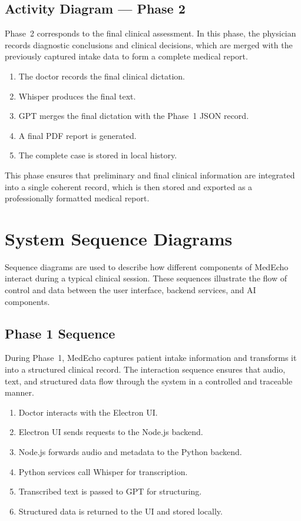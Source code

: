 \subsection{Activity Diagram — Phase 2}\label{sec:analysis:activity2}

Phase~2 corresponds to the final clinical assessment. In this phase, the physician records diagnostic conclusions and clinical decisions, which are merged with the previously captured intake data to form a complete medical report.


\begin{enumerate}
    \item The doctor records the final clinical dictation.
    \item Whisper produces the final text.
    \item GPT merges the final dictation with the Phase~1 JSON record.
    \item A final PDF report is generated.
    \item The complete case is stored in local history.
\end{enumerate}
This phase ensures that preliminary and final clinical information are integrated into a single coherent record, which is then stored and exported as a professionally formatted medical report.




\section{System Sequence Diagrams}\label{sec:analysis:seq}

Sequence diagrams are used to describe how different components of MedEcho interact during a typical clinical session. These sequences illustrate the flow of control and data between the user interface, backend services, and AI components.


\subsection*{Phase 1 Sequence}

During Phase~1, MedEcho captures patient intake information and transforms it into a structured clinical record. The interaction sequence ensures that audio, text, and structured data flow through the system in a controlled and traceable manner.

\begin{enumerate}
    \item Doctor interacts with the Electron UI.
    \item Electron UI sends requests to the Node.js backend.
    \item Node.js forwards audio and metadata to the Python backend.
    \item Python services call Whisper for transcription.
    \item Transcribed text is passed to GPT for structuring.
    \item Structured data is returned to the UI and stored locally.
\end{enumerate}


